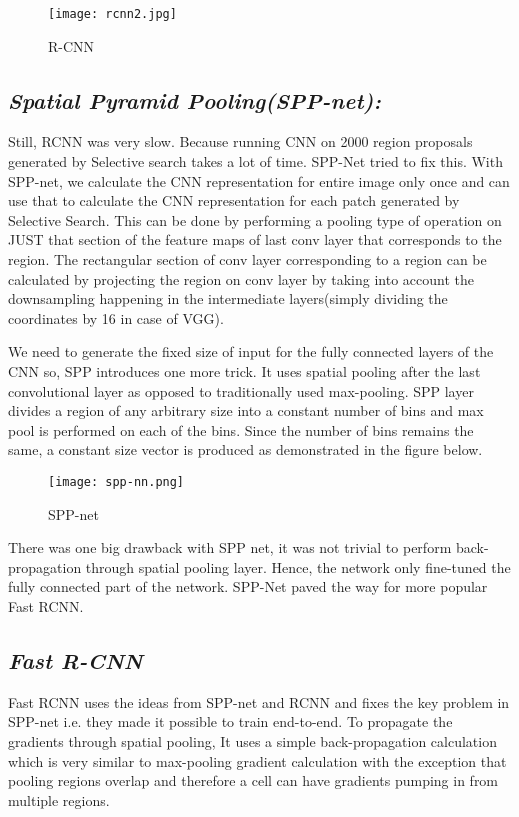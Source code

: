 		\begin{figure}[htbp]
			\centering
			\texttt{[image: rcnn2.jpg]}
			\caption{R-CNN\label{R-CNN}}
		\end{figure}
		
		
	\subsection{\emph{Spatial Pyramid Pooling(SPP-net):}}
		Still, RCNN was very slow. Because running CNN on 2000 region proposals generated by Selective search takes a lot of time. SPP-Net tried to fix this. With SPP-net, we calculate the CNN representation for entire image only once and can use that to calculate the CNN representation for each patch generated by Selective Search. This can be done by performing a pooling type of operation on JUST that section of the feature maps of last conv layer that corresponds to the region. The rectangular section of conv layer corresponding to a region can be calculated by projecting the region on conv layer by taking into account the downsampling happening in the intermediate layers(simply dividing the coordinates by 16 in case of VGG). 
		
		We need to generate the fixed size of input for the fully connected layers of the CNN so, SPP introduces one more trick. It uses spatial pooling after the last convolutional layer as opposed to traditionally used max-pooling. SPP layer divides a region of any arbitrary size into a constant number of bins and max pool is performed on each of the bins. Since the number of bins remains the same, a constant size vector is produced as demonstrated in the figure below.
		\begin{figure}[htbp]
			\centering
			\texttt{[image: spp-nn.png]}
			\caption{SPP-net\label{SPP-net}}
		\end{figure}
		There was one big drawback with SPP net, it was not trivial to perform back-propagation through spatial pooling layer. Hence, the network only fine-tuned the fully connected part of the network. SPP-Net paved the way for more popular Fast RCNN.
		
	\subsection{\emph{Fast R-CNN}}
		Fast RCNN uses the ideas from SPP-net and RCNN and fixes the key problem in SPP-net i.e. they made it possible to train end-to-end. To propagate the gradients through spatial pooling,  It uses a simple back-propagation calculation which is very similar to max-pooling gradient calculation with the exception that pooling regions overlap and therefore a cell can have gradients pumping in from multiple regions.
		
